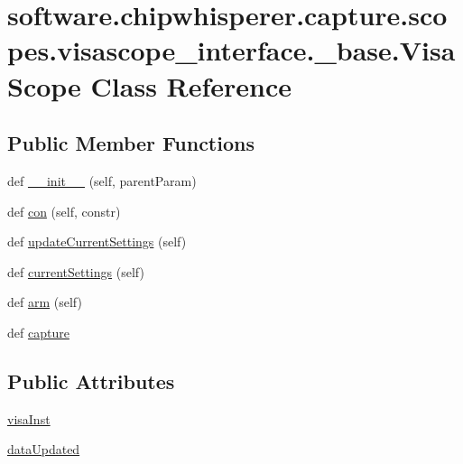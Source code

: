 \hypertarget{classsoftware_1_1chipwhisperer_1_1capture_1_1scopes_1_1visascope__interface_1_1__base_1_1VisaScope}{}\section{software.\+chipwhisperer.\+capture.\+scopes.\+visascope\+\_\+interface.\+\_\+base.\+Visa\+Scope Class Reference}
\label{classsoftware_1_1chipwhisperer_1_1capture_1_1scopes_1_1visascope__interface_1_1__base_1_1VisaScope}
\subsection*{Public Member Functions}
\begin{DoxyCompactItemize}
\item 
def \hyperlink{classsoftware_1_1chipwhisperer_1_1capture_1_1scopes_1_1visascope__interface_1_1__base_1_1VisaScope_aaa30a307aad271865d2d7b36485e79c4}{\+\_\+\+\_\+init\+\_\+\+\_\+} (self, parent\+Param)
\item 
def \hyperlink{classsoftware_1_1chipwhisperer_1_1capture_1_1scopes_1_1visascope__interface_1_1__base_1_1VisaScope_a3eebf6f3514a3560002d11657fea489b}{con} (self, constr)
\item 
def \hyperlink{classsoftware_1_1chipwhisperer_1_1capture_1_1scopes_1_1visascope__interface_1_1__base_1_1VisaScope_a5b5a678f66dd16e74c65f112641fe982}{update\+Current\+Settings} (self)
\item 
def \hyperlink{classsoftware_1_1chipwhisperer_1_1capture_1_1scopes_1_1visascope__interface_1_1__base_1_1VisaScope_a4c9e946395046c1256563a02da25499a}{current\+Settings} (self)
\item 
def \hyperlink{classsoftware_1_1chipwhisperer_1_1capture_1_1scopes_1_1visascope__interface_1_1__base_1_1VisaScope_ae932d68c8f618006c08738be64b130ab}{arm} (self)
\item 
def \hyperlink{classsoftware_1_1chipwhisperer_1_1capture_1_1scopes_1_1visascope__interface_1_1__base_1_1VisaScope_a392cba4183f3e11a2c2f353b9b0ddc29}{capture}
\end{DoxyCompactItemize}
\subsection*{Public Attributes}
\begin{DoxyCompactItemize}
\item 
\hyperlink{classsoftware_1_1chipwhisperer_1_1capture_1_1scopes_1_1visascope__interface_1_1__base_1_1VisaScope_ad73302512f7ba36f445dc9020f038606}{visa\+Inst}
\item 
\hyperlink{classsoftware_1_1chipwhisperer_1_1capture_1_1scopes_1_1visascope__interface_1_1__base_1_1VisaScope_a70524016d46a5a5d85386275f2fea8e9}{data\+Updated}
\end{DoxyCompactItemize}
